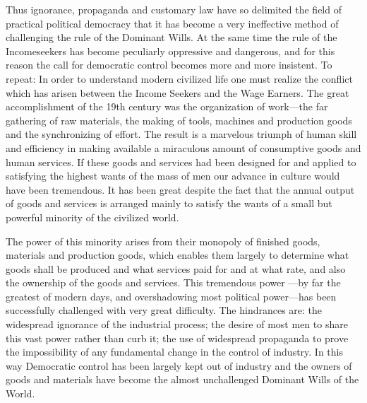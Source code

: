 \documentclass[letterpaper,10pt,english]{jupyterBook}
\begin{document}
\sphinxAtStartPar
Thus ignorance, propaganda and customary law have so delimited the field of practical political democracy that it has become a very ineffective method of challenging the rule of the Dominant Wills. At the same time the rule of the Income\sphinxhyphen{}seekers has become peculiarly oppressive and dangerous, and for this reason the call for democratic control becomes more and more insistent. To repeat: In order to understand modern civilized life one must realize the conflict which has arisen between the Income Seekers and the Wage Earners. The great accomplishment of the 19th century was the organization of work—the far gathering of raw materials, the making of tools, machines and production goods and the synchronizing of effort. The result is a marvelous triumph of human skill and efficiency in making available a miraculous amount of consumptive goods and human services. If these goods and services had been designed for and applied to satisfying the highest wants of the mass of men our advance in culture would have been tremendous. It has been great despite the fact that the annual output of goods and services is arranged mainly to satisfy the wants of a small but powerful minority of the civilized world.

\sphinxAtStartPar
The power of this minority arises from their monopoly of finished goods, materials and production goods, which enables them largely to determine what goods shall be produced and what services paid for and at what rate, and also the ownership of the goods and services. This tremendous power —by far the greatest of modern days, and overshadowing most political power—has been successfully challenged with very great difficulty. The hindrances are: the widespread ignorance of the industrial process; the desire of most men to share this vast power rather than curb it; the use of widespread propaganda to prove the impossibility of any fundamental change in the control of industry. In this way Democratic control has been largely kept out of industry and the owners of goods and materials have become the almost unchallenged Dominant Wills of the World.
\end{document}
